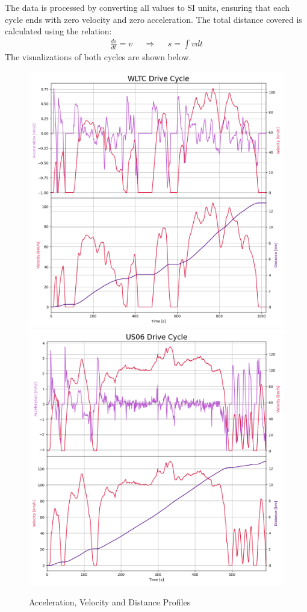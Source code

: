 	The data is processed by converting all values to SI units, ensuring that each cycle ends with zero velocity and zero acceleration. The total distance covered is calculated using the relation:
	\begin{align*}
		\frac{ds}{dt} = v && \Rightarrow && s = \int v dt
    \end{align*}
	The visualizations of both cycles are shown below.
	\begin{figure}[H]
		\begin{center}
			\includegraphics[width=\linewidth]{images/WLTC.png}
			\includegraphics[width=\linewidth]{images/US06.png}
		\end{center}
		\caption{Acceleration, Velocity and Distance Profiles}
	\end{figure}
